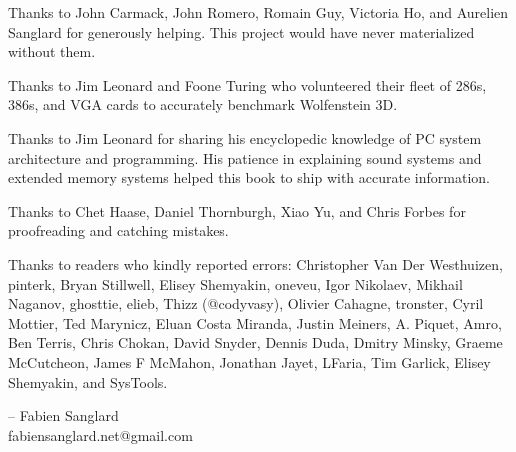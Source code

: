 Thanks to John Carmack, John Romero, Romain Guy, Victoria Ho, and Aurelien Sanglard for generously helping. This project would have never
materialized without them.\\ 
\par
Thanks to  Jim Leonard and Foone Turing who volunteered their fleet of 286s, 386s, and VGA cards to accurately benchmark Wolfenstein 3D.\\
\par
Thanks to  Jim Leonard for sharing his encyclopedic knowledge of PC system architecture and programming. His patience in explaining sound systems and extended memory systems helped this book to ship with accurate information.\\
\par
Thanks to  Chet Haase, Daniel Thornburgh, Xiao Yu, and Chris Forbes for proofreading and catching mistakes.\\
\par
Thanks to readers who kindly reported errors: Christopher Van Der Westhuizen, pinterk, Bryan Stillwell, Elisey Shemyakin, oneveu, Igor Nikolaev, Mikhail Naganov, ghosttie, elieb, Thizz (@codyvasy), Olivier Cahagne, tronster, Cyril Mottier, Ted Marynicz, Eluan Costa Miranda, Justin Meiners, A. Piquet, Amro, Ben Terris, Chris Chokan, David Snyder, Dennis Duda, Dmitry Minsky, Graeme McCutcheon, James F McMahon, Jonathan Jayet, LFaria, Tim Garlick, Elisey Shemyakin, and SysTools.\\
\par
-- Fabien Sanglard\\
fabiensanglard.net@gmail.com
\thispagestyle{plain} %
